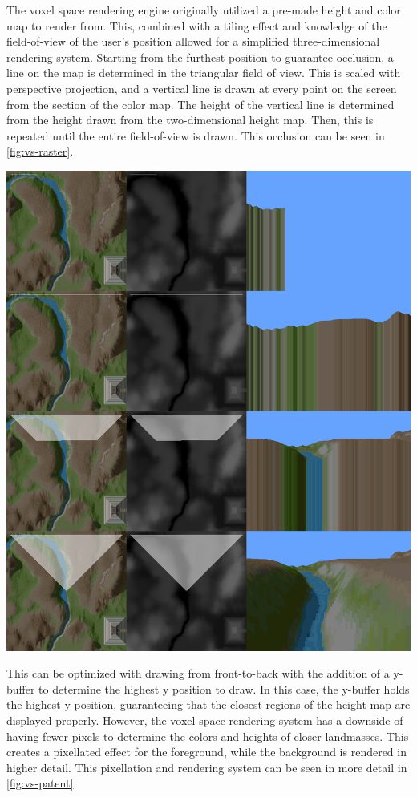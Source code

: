 \documentclass[10pt]{report}
\begin{document}
		The voxel space rendering engine originally utilized a pre-made height and color map to render from. This, combined with a tiling effect and knowledge of the field-of-view of the user's position allowed for a simplified three-dimensional rendering system. Starting from the furthest position to guarantee occlusion, a line on the map is determined in the triangular field of view. This is scaled with perspective projection, and a vertical line is drawn at every point on the screen from the section of the color map. The height of the vertical line is determined from the height drawn from the two-dimensional height map. Then, this is repeated until the entire field-of-view is drawn. This occlusion can be seen in \autoref{fig:vs-raster}. 
		
		\begin{minipage}{\textwidth}
			\centering
			\includegraphics[scale=.2]{line-by-line}
			\label{fig:vs-raster}
		\end{minipage}
	
		This can be optimized with drawing from front-to-back with the addition of a y-buffer to determine the highest y position to draw. In this case, the y-buffer holds the highest y position, guaranteeing that the closest regions of the height map are displayed properly. However, the voxel-space rendering system has a downside of having fewer pixels to determine the colors and heights of closer landmasses. This creates a pixellated effect for the foreground, while the background is rendered in higher detail. This pixellation and rendering system can be seen in more detail in \autoref{fig:vs-patent}. 
		 
\end{document}

